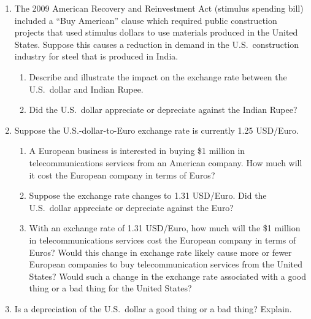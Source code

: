\documentclass{assignment}
\begin{document}
\begin{enumerate}
\begin{enumerate}
\vspace{5.0\baselineskip}

\end{enumerate}

\item The 2009 American Recovery and Reinvestment Act (stimulus spending bill) included a ``Buy American''
clause which required public construction projects that used stimulus dollars to use materials
produced in the United States. Suppose this causes a reduction in demand in the U.S.~construction
industry for steel that is produced in India.

\begin{enumerate}

\item Describe and illustrate the impact on the exchange rate between the U.S.~dollar and Indian
Rupee.

\vfill

\item Did the U.S.~dollar appreciate or depreciate against the Indian Rupee?

\vspace{3.0\baselineskip}

\end{enumerate}

\clearpage

\item Suppose the U.S.-dollar-to-Euro exchange rate is currently 1.25 USD/Euro.

\begin{enumerate}

\item A European business is interested in buying \$1 million in telecommunications services from an
American company. How much will it cost the European company in terms of Euros?

\vfill

\item Suppose the exchange rate changes to 1.31 USD/Euro. Did the U.S.~dollar appreciate or depreciate
against the Euro?

\vfill

\item With an exchange rate of 1.31 USD/Euro, how much will the \$1 million in telecommunications
services cost the European company in terms of Euros? Would this change in exchange rate likely
cause more or fewer European companies to buy telecommunication services from the United
States? Would such a change in the exchange rate associated with a good thing or a bad thing
for the United States?

\vfill

\end{enumerate}

\item Is a depreciation of the U.S.~dollar a good thing or a bad thing? Explain.

\vfill

\end{enumerate}
\end{document}
